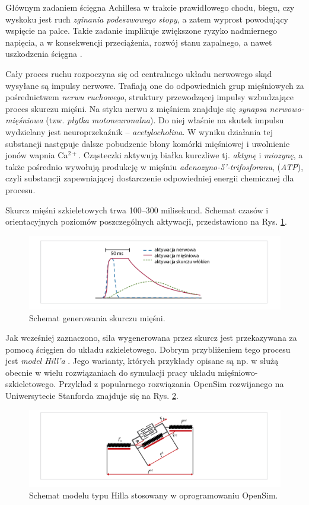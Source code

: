Głównym zadaniem ścięgna Achillesa w trakcie prawidłowego chodu, biegu, czy wyskoku jest ruch \textit{zginania podeszwowego stopy}, a zatem wyprost powodujący wspięcie na palce. Takie zadanie implikuje zwiększone ryzyko nadmiernego napięcia, a w konsekwencji przeciążenia, rozwój stanu zapalnego, a nawet uszkodzenia ścięgna \cite{Etiologia}.

Cały proces ruchu rozpoczyna się od centralnego układu nerwowego skąd wysyłane są impulsy nerwowe. Trafiają one do odpowiednich grup mięśniowych za pośrednictwem \textit{nerwu ruchowego}, struktury  przewodzącej impulsy wzbudzające proces skurczu mięśni. Na styku nerwu z mięśniem znajduje się \textit{synapsa nerwowo-mięśniowa} (tzw. \textit{płytka motoneuronalna}). Do niej właśnie na skutek impulsu wydzielany jest neuroprzekaźnik -- \textit{acetylocholina}. W wyniku działania tej substancji następuje dalsze pobudzenie błony komórki mięśniowej i uwolnienie jonów wapnia Ca$^{2+}$. Cząsteczki aktywują białka kurczliwe tj. \textit{aktynę} i \textit{miozynę}, a także pośrednio wywołują produkcję w mięśniu \textit{adenozyno-5'-trifosforanu}, (\textit{ATP}), czyli substancji zapewniającej dostarczenie odpowiedniej energii chemicznej dla procesu.

Skurcz mięśni szkieletowych trwa 100--300 milisekund. Schemat czasów i orientacyjnych poziomów poszczególnych aktywacji, przedstawiono na Rys. \ref{muscle-excitements}. 
\begin{figure}[h!]
	\centering
	\includegraphics[width=1\textwidth]{figures/skurcz_miesni.png}
	\caption{Schemat generowania skurczu mięśni.}
	\label{muscle-excitements}
\end{figure}
Jak wcześniej zaznaczono, siła wygenerowana przez skurcz jest przekazywana za pomocą ścięgien do układu szkieletowego. Dobrym przybliżeniem tego procesu jest \textit{model Hill'a} \cite{Hill1938}. Jego warianty, których przykłady opisane są np. w \cite{Perreault2003} służą obecnie w wielu rozwiązaniach do symulacji pracy układu mięśniowo-szkieletowego. Przykład z popularnego rozwiązania OpenSim rozwijanego na Uniwersytecie Stanforda znajduje się na Rys. \ref{hill-model}.
\begin{figure}[h!]
	\centering
	\includegraphics[width=1\textwidth]{figures/Hill.png}
	\caption{Schemat modelu typu Hilla stosowany w oprogramowaniu OpenSim.}
	\label{hill-model}
\end{figure}

